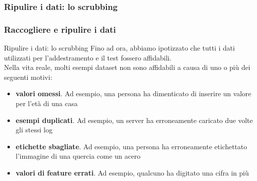 \subsubsection[Mappare valori numerici]{Ripulire i dati: lo scrubbing}
\begin{frame}

	\frametitle{{\color{GradientDescentDiagramBlue}Raccogliere e ripulire i dati}}

	\begin{block}{Ripulire i dati: lo scrubbing}
		Fino ad ora, abbiamo ipotizzato che tutti i dati utilizzati per l'addestramento e il test fossero affidabili.\\
		\vspace{1mm}
		Nella vita reale, molti esempi dataset non sono affidabili a causa di uno o più dei seguenti motivi:

		\begin{itemize}
			\item \textbf{valori omessi}. Ad esempio, una persona ha dimenticato di inserire un valore per l'età di una casa
			\item \textbf{esempi duplicati}. Ad esempio, un server ha erroneamente caricato due volte gli stessi log
			\item \textbf{etichette sbagliate}. Ad esempio, una persona ha erroneamente etichettato l'immagine di una quercia come un acero
			\item \textbf{valori di feature errati}. Ad esempio, qualcuno ha digitato una cifra in più
		\end{itemize}

	\end{block}

\end{frame}
